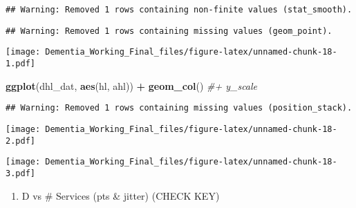\documentclass[]{article}
\newenvironment{Shaded}{\begin{snugshade}}{\end{snugshade}}
\newcommand{\CommentTok}[1]{\textcolor[rgb]{0.56,0.35,0.01}{\textit{#1}}}
\newcommand{\DecValTok}[1]{\textcolor[rgb]{0.00,0.00,0.81}{#1}}
\newcommand{\KeywordTok}[1]{\textcolor[rgb]{0.13,0.29,0.53}{\textbf{#1}}}
\newcommand{\NormalTok}[1]{#1}
\newcommand{\OperatorTok}[1]{\textcolor[rgb]{0.81,0.36,0.00}{\textbf{#1}}}
\newcommand{\StringTok}[1]{\textcolor[rgb]{0.31,0.60,0.02}{#1}}
\providecommand{\tightlist}{%
  \setlength{\itemsep}{0pt}\setlength{\parskip}{0pt}}
\begin{document}
\begin{verbatim}
## Warning: Removed 1 rows containing non-finite values (stat_smooth).
\end{verbatim}

\begin{verbatim}
## Warning: Removed 1 rows containing missing values (geom_point).
\end{verbatim}

\texttt{[image: Dementia\_Working\_Final\_files/figure-latex/unnamed-chunk-18-1.pdf]}

\begin{Shaded}
\begin{Highlighting}[]
\KeywordTok{ggplot}\NormalTok{(dhl_dat, }\KeywordTok{aes}\NormalTok{(hl, ahl)) }\OperatorTok{+}\StringTok{ }\KeywordTok{geom_col}\NormalTok{() }\CommentTok{#+ y_scale}
\end{Highlighting}
\end{Shaded}

\begin{verbatim}
## Warning: Removed 1 rows containing missing values (position_stack).
\end{verbatim}

\texttt{[image: Dementia\_Working\_Final\_files/figure-latex/unnamed-chunk-18-2.pdf]}

\begin{Shaded}
\end{Shaded}

\texttt{[image: Dementia\_Working\_Final\_files/figure-latex/unnamed-chunk-18-3.pdf]}

\begin{enumerate}
\def\labelenumi{\alph{enumi}.}
\setcounter{enumi}{2}
\tightlist
\item
  D vs \# Services (pts \& jitter) (CHECK KEY)
\end{enumerate}
\end{document}
